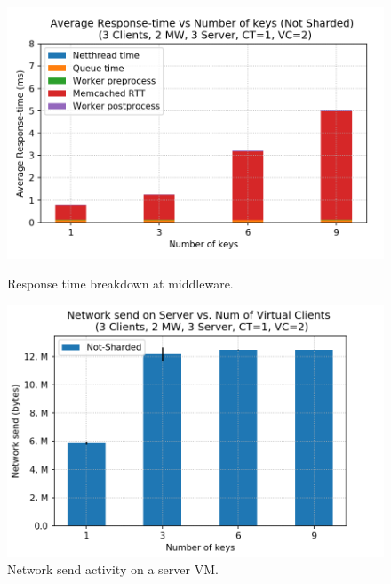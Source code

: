 \begin{figure}[ht]
   \begin{minipage}{0.48\textwidth}
    \centering
	\includegraphics[scale=0.48]{figures/4_GetsAndMultigets/rt_breakdown_notsharded_2018-11-22_18h12.png}
	\caption{Response time breakdown at middleware.}
	\label{rt_breakdown_nonsharded}
   \end{minipage}\hfill
   \begin{minipage}{0.48\textwidth}
     \centering
     \includegraphics[width=1\linewidth]{figures/4_GetsAndMultigets/dstat_server_netsend_sharded_False_2018-11-22_18h12.png}
     \caption{Network send activity on a server VM.}\label{nonsharded_netsend_server}
   \end{minipage}
\end{figure}
